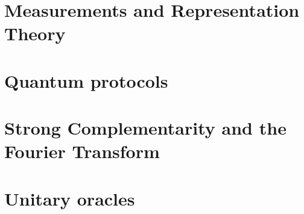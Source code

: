 \begin{defn}
\end{defn}

\section{Measurements and Representation Theory}

\section{Quantum protocols}

\section{Strong Complementarity and the Fourier Transform}

\section{Unitary oracles}
